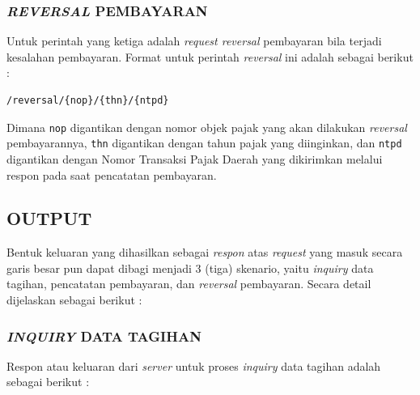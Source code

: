 \documentclass[pdftex,12pt, oneside]{article}
\begin{document}
\subsubsection{\textit{REVERSAL} PEMBAYARAN}

Untuk perintah yang ketiga adalah \textit{request reversal} pembayaran bila terjadi kesalahan pembayaran. Format untuk perintah \textit{reversal} ini adalah sebagai berikut :

\begin{lstlisting}
/reversal/{nop}/{thn}/{ntpd}
\end{lstlisting}

Dimana \texttt{nop} digantikan dengan nomor objek pajak yang akan dilakukan \textit{reversal} pembayarannya, \texttt{thn} digantikan dengan tahun pajak yang diinginkan, dan \texttt{ntpd} digantikan dengan Nomor Transaksi Pajak Daerah yang dikirimkan melalui respon pada saat pencatatan pembayaran.


\subsection{OUTPUT} 

Bentuk keluaran yang dihasilkan sebagai \textit{respon} atas \textit{request} yang masuk secara garis besar pun dapat dibagi menjadi 3 (tiga) skenario, yaitu \textit{inquiry} data tagihan, pencatatan pembayaran, dan \textit{reversal} pembayaran. Secara detail dijelaskan sebagai berikut :

\subsubsection{\textit{INQUIRY} DATA TAGIHAN}

Respon atau keluaran dari \textit{server} untuk proses \textit{inquiry} data tagihan adalah sebagai berikut :
\end{document}
